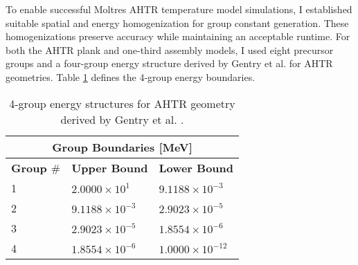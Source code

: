 To enable successful Moltres \gls{AHTR} temperature model simulations, I established 
suitable spatial and energy homogenization for group constant generation. 
These homogenizations preserve accuracy while maintaining an acceptable runtime.
For both the \gls{AHTR} plank and one-third assembly models, I used eight precursor 
groups and a four-group energy structure derived by Gentry et al. 
\cite{gentry_development_2016} for \gls{AHTR} geometries. 
Table \ref{tab:energy_structures} defines the 4-group energy boundaries. 
\begin{table}[htbp]
    \centering
    \onehalfspacing
    \caption{4-group energy structures for \acrfull{AHTR} geometry 
    derived by Gentry et al. \cite{gentry_development_2016}.}
	\label{tab:energy_structures}
    \footnotesize
    \begin{tabular}{lll}
    \hline
    \multicolumn{3}{c}{\textbf{Group Boundaries [MeV]}} \\ 
    \hline
    \textbf{Group $\#$}& \textbf{Upper Bound} & \textbf{Lower Bound}  \\
    \hline 
    1 & $2.0000\times 10^1$ & $9.1188\times 10^{-3}$ \\ 
    2 & $9.1188\times 10^{-3}$ & $2.9023\times 10^{-5}$\\
    3 & $2.9023\times 10^{-5}$ & $1.8554\times 10^{-6}$\\
    4 & $1.8554\times 10^{-6}$ & $1.0000\times 10^{-12}$\\
    \hline
    \end{tabular}
\end{table}

